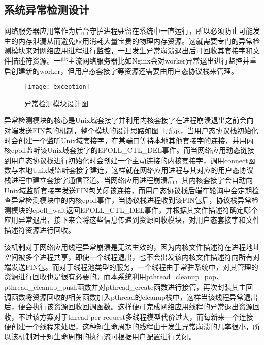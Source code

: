 \subsection{系统异常检测设计}

网络服务器应用常作为后台守护进程驻留在系统中一直运行，所以必须防止可能发生的内存泄漏从而避免应用消耗大量宝贵的物理内存资源。这就需要专门的异常检测模块来对网络应用进程进行监控，一旦发生异常崩溃退出后可回收其套接字和文件描述符资源。一些主流网络服务器比如Nginx会对worker异常退出进行监控并重启创建新的worker，但用户态套接字等资源还需要由用户态协议栈来管理。

\vspace{-10pt}
\begin{figure}[H] %
  \centering
  \texttt{[image: exception]}
  \caption{异常检测模块设计图}
  \label{fig:exception}
\end{figure}
\vspace{-10pt}

异常检测模块的核心是Unix域套接字并利用内核套接字在进程崩溃退出之前会向对端发送FIN包的机制，整个模块的设计思路如图~\ref{fig:exception}所示，当用户态协议栈初始化时会创建一个监听Unix域套接字，在某端口等待本地其他套接字的连接，并用内核epoll监听该Unix域套接字的EPOLL\_CTL\_DEL事件。而当网络应用动态链接到用户态协议栈进行初始化时会创建一个主动连接的内核套接字，调用connect函数与本地Unix域监听套接字建连，这样就在网络应用进程与其对应的用户态协议栈进程中建立套接字通信管道。当网络应用进程崩溃后，其内核套接字会自动向Unix域监听套接字发送FIN包关闭该连接，而用户态协议栈后端在轮询中会定期检查异常检测模块中的内核epoll事件，当协议栈进程收到该FIN包后，协议栈异常检测模块的epoll\_wait返回EPOLL\_CTL\_DEL事件，并根据其文件描述符确定哪个应用异常退出，接下来会将这些信息传递到资源回收模块，对用户态套接字和文件描述符资源进行回收。

该机制对于网络应用线程异常崩溃是无法生效的，因为内核文件描述符在进程地址空间被多个进程共享，即使一个线程退出，也不会出发该内核文件描述符向所有对端发送FIN包。而对于线程池类型的服务，一个线程由于常驻系统中，对其管理的资源进行回收也是很有必要的。而本系统利用pthread\_cleanup\_pop、pthread\_cleanup\_push函数并对pthread\_create函数进行接管，再次封装其主回调函数将资源回收的相关函数加入pthread的cleanup栈中，这样当该线程异常退出后，便会执行该资源回收回调函数。这样便可完成网络应用线程的异常退出资源回收，不过该方案对于thread per request多线程模型代价过大，而每新来一个连接便创建一个线程来处理，这种短生命周期的线程由于发生异常崩溃的几率很小，所以该机制对于短生命周期的执行流可根据用户配置进行关闭。